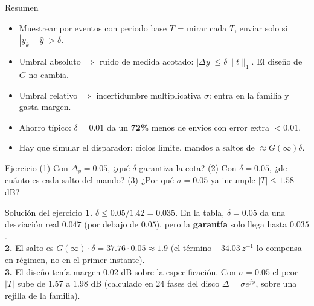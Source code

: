 \documentclass[aspectratio=169,11pt]{beamer}
\begin{document}
\begin{frame}{Resumen}
  \small
  \begin{itemize}
    \item Muestrear por eventos con periodo base $T$ = mirar cada $T$, enviar solo si $|y_k-\hat y|>\delta$.
    \item Umbral absoluto $\Rightarrow$ ruido de medida acotado: $|\Delta y|\le\delta\|t\|_1$. El diseño de $G$ no cambia.
    \item Umbral relativo $\Rightarrow$ incertidumbre multiplicativa $\sigma$: entra en la familia y gasta margen.
    \item Ahorro típico: $\delta=0.01$ da un \textbf{72\%} menos de envíos con error extra $<0.01$.
    \item Hay que simular el disparador: ciclos límite, mandos a saltos de $\approx G(\infty)\delta$.
  \end{itemize}
  \begin{block}{Ejercicio}
    (1) Con $\Delta_y=0.05$, ¿qué $\delta$ garantiza la cota? (2) Con $\delta=0.05$, ¿de cuánto es cada salto del mando? (3) ¿Por qué $\sigma=0.05$ ya incumple $|T|\le1.58$ dB?
  \end{block}
\end{frame}

\appendix
\begin{frame}{Solución del ejercicio}
  \footnotesize
  \textbf{1.} $\delta\le0.05/1.42=0.035$. En la tabla, $\delta=0.05$ da una desviación real $0.047$ (por debajo de $0.05$), pero la \textbf{garantía} solo llega hasta $0.035$.\\[3pt]
  \textbf{2.} El salto es $G(\infty)\cdot\delta=37.76\cdot0.05\approx1.9$ (el término $-34.03\,z^{-1}$ lo compensa en régimen, no en el primer instante).\\[3pt]
  \textbf{3.} El diseño tenía margen $0.02$ dB sobre la especificación. Con $\sigma=0.05$ el peor $|T|$ sube de $1.57$ a $1.98$ dB (calculado en 24 fases del disco $\Delta=\sigma e^{j\phi}$, sobre una rejilla de la familia).
\end{frame}
\end{document}
